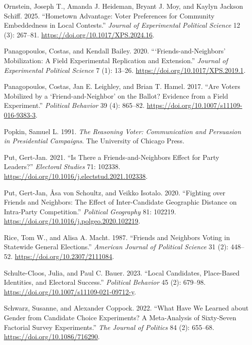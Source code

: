 \documentclass[
  letterpaper,
  DIV=11,
  numbers=noendperiod]{scrartcl}
\newlength{\cslhangindent}
\newenvironment{CSLReferences}[2] %
 {\begin{list}{}{%
  \setlength{\itemindent}{0pt}
  \setlength{\leftmargin}{0pt}
  \setlength{\parsep}{0pt}
  \ifodd #1
   \setlength{\leftmargin}{\cslhangindent}
   \setlength{\itemindent}{-1\cslhangindent}
  \fi
  \setlength{\itemsep}{#2\baselineskip}}}
 {\end{list}}
\begin{document}
\begin{CSLReferences}{1}{1}
Ornstein, Joseph T., Amanda J. Heideman, Bryant J. Moy, and Kaylyn
Jackson Schiff. 2025. {``Hometown Advantage: Voter Preferences for
Community Embeddedness in Local Contests.''} \emph{Journal of
Experimental Political Science} 12 (3): 267--81.
\url{https://doi.org/10.1017/XPS.2024.16}.

Panagopoulos, Costas, and Kendall Bailey. 2020.
{``{{`Friends-and-Neighbors'}} Mobilization: A Field Experimental
Replication and Extension.''} \emph{Journal of Experimental Political
Science} 7 (1): 13--26. \url{https://doi.org/10.1017/XPS.2019.1}.

Panagopoulos, Costas, Jan E. Leighley, and Brian T. Hamel. 2017. {``Are
Voters Mobilized by a {{`Friend-and-Neighbor'}} on the Ballot? Evidence
from a Field Experiment.''} \emph{Political Behavior} 39 (4): 865--82.
\url{https://doi.org/10.1007/s11109-016-9383-3}.

Popkin, Samuel L. 1991. \emph{The Reasoning Voter: Communication and
Persuasion in Presidential Campaigns}. The University of Chicago Press.

Put, Gert-Jan. 2021. {``Is There a Friends-and-Neighbors Effect for
Party Leaders?''} \emph{Electoral Studies} 71: 102338.
\url{https://doi.org/10.1016/j.electstud.2021.102338}.

{Put, Gert-Jan, Åsa von Schoultz, and Veikko Isotalo}. 2020. {``Fighting
over Friends and Neighbors: The Effect of Inter-Candidate Geographic
Distance on Intra-Party Competition.''} \emph{Political Geography} 81:
102219. \url{https://doi.org/10.1016/j.polgeo.2020.102219}.

Rice, Tom W., and Alisa A. Macht. 1987. {``Friends and Neighbors Voting
in Statewide General Elections.''} \emph{American Journal of Political
Science} 31 (2): 448--52. \url{https://doi.org/10.2307/2111084}.

Schulte-Cloos, Julia, and Paul C. Bauer. 2023. {``Local Candidates,
Place-Based Identities, and Electoral Success.''} \emph{Political
Behavior} 45 (2): 679--98.
\url{https://doi.org/10.1007/s11109-021-09712-y}.

Schwarz, Susanne, and Alexander Coppock. 2022. {``What Have We Learned
about Gender from Candidate Choice Experiments? A Meta-Analysis of
Sixty-Seven Factorial Survey Experiments.''} \emph{The Journal of
Politics} 84 (2): 655--68. \url{https://doi.org/10.1086/716290}.


\end{CSLReferences}
\end{document}

